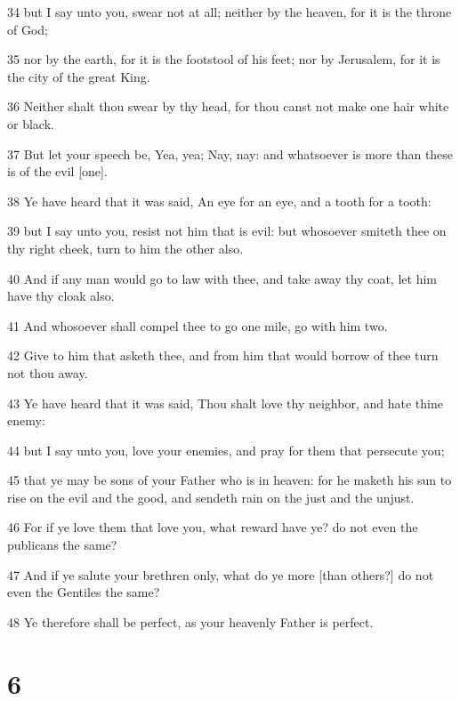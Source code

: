 \par 34 but I say unto you, swear not at all; neither by the heaven, for it is the throne of God;
\par 35 nor by the earth, for it is the footstool of his feet; nor by Jerusalem, for it is the city of the great King.
\par 36 Neither shalt thou swear by thy head, for thou canst not make one hair white or black.
\par 37 But let your speech be, Yea, yea; Nay, nay: and whatsoever is more than these is of the evil [one].
\par 38 Ye have heard that it was said, An eye for an eye, and a tooth for a tooth:
\par 39 but I say unto you, resist not him that is evil: but whosoever smiteth thee on thy right cheek, turn to him the other also.
\par 40 And if any man would go to law with thee, and take away thy coat, let him have thy cloak also.
\par 41 And whosoever shall compel thee to go one mile, go with him two.
\par 42 Give to him that asketh thee, and from him that would borrow of thee turn not thou away.
\par 43 Ye have heard that it was said, Thou shalt love thy neighbor, and hate thine enemy:
\par 44 but I say unto you, love your enemies, and pray for them that persecute you;
\par 45 that ye may be sons of your Father who is in heaven: for he maketh his sun to rise on the evil and the good, and sendeth rain on the just and the unjust.
\par 46 For if ye love them that love you, what reward have ye? do not even the publicans the same?
\par 47 And if ye salute your brethren only, what do ye more [than others?] do not even the Gentiles the same?
\par 48 Ye therefore shall be perfect, as your heavenly Father is perfect.

\chapter{6}


